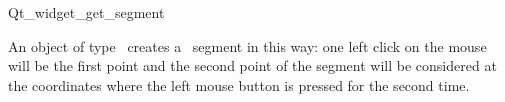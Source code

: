 
\begin{ccRefClass}{Qt_widget_get_segment}

\ccDefinition
An object of type \ccRefName\ creates a \cgal\ segment in this 
way: one left click on the mouse will be the first point and the second point 
of the segment will be considered at the coordinates where the left
mouse button is pressed for the second time.


\ccInheritsFrom
{}

\ccGlue

\ccCreation
{}


\end{ccRefClass}








